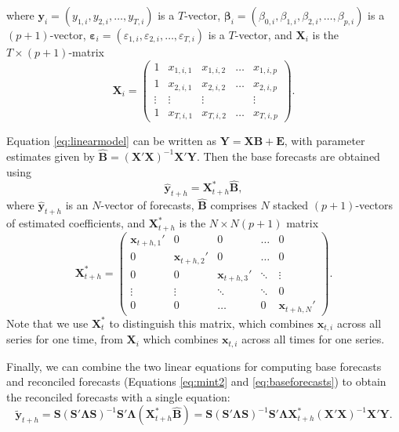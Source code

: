 \documentclass[11pt,a4paper,]{article}
\begin{document}
where \(\bm{y}_i = (y_{1,i}, y_{2,i}, \dots, y_{T,i})\) is a \(T\)-vector, \({\bm{\beta}}_i = (\beta_{0,i}, \beta_{1,i}, \beta_{2,i}, \dots, \beta_{p,i})\) is a \((p+1)\)-vector, \({\bm{\varepsilon}}_i = (\varepsilon_{1,i}, \varepsilon_{2,i}, \dots, \varepsilon_{T,i})\) is a \(T\)-vector, and \(\bm{X}_i\) is the \(T\times (p+1)\)-matrix
\begin{equation}\label{eq:Xmatrixdefinition}
  \bm{X}_i = \begin{pmatrix}
  1 & x_{1,i,1} & x_{1,i,2} & \dots & x_{1,i,p}\\
  1 & x_{2,i,1} & x_{2,i,2} & \dots & x_{2,i,p}\\
  \vdots & \vdots & \vdots & & \vdots \\
  1 & x_{T,i,1} & x_{T,i,2} & \dots & x_{T,i,p}
\end{pmatrix}.
\end{equation}

Equation \eqref{eq:linearmodel} can be written as \(\bm{Y} = \bm{X} \bm{B} + \bm{E}\), with parameter estimates given by \(\hat{\bm{B}} = (\bm{X}'\bm{X})^{-1} \bm{X}'\bm{Y}\). Then the base forecasts are obtained using
\begin{equation}\label{eq:baseforecasts}
  \hat{\bm{y}}_{t+h} = \bm{X}_{t+h}^* \hat{\bm{B}},
\end{equation}
where \(\hat{\bm{y}}_{t+h}\) is an \(N\)-vector of forecasts, \(\hat{\bm{B}}\) comprises \(N\) stacked \((p+1)\)-vectors of estimated coefficients, and \(\bm{X}_{t+h}^*\) is the \(N\times N(p+1)\) matrix
\pagebreak[3]\begin{equation}
  \bm{X}_{t+h}^* =
  \begin{pmatrix}
  \bm{x}_{t+h,1}' & 0               & 0               & \dots  & 0\\
  0               & \bm{x}_{t+h,2}' & 0               & \dots  & 0\\
  0               & 0               & \bm{x}_{t+h,3}' & \ddots & \vdots \\
  \vdots          & \vdots          & \ddots          & \ddots & 0\\
  0               & 0               & \dots           & 0      & \bm{x}_{t+h,N}'
  \end{pmatrix}.
\end{equation}
Note that we use \(\bm{X}^*_{t}\) to distinguish this matrix, which combines \(\bm{x}_{t,i}\) across all series for one time, from \(\bm{X}_i\) which combines \(\bm{x}_{t,i}\) across all times for one series.

Finally, we can combine the two linear equations for computing base forecasts and reconciled forecasts (Equations \eqref{eq:mint2} and \eqref{eq:baseforecasts}) to obtain the reconciled forecasts with a single equation:
\begin{equation}\label{eq:singlestep}
    \tilde{\bm{y}}_{t+h} = \bm{S}(\bm{S}'\bm{\Lambda}\bm{S})^{-1}\bm{S}'\bm{\Lambda}
                            (\bm{X}_{t+h}^* \hat{\bm{B}})
                         = \bm{S}(\bm{S}'\bm{\Lambda}\bm{S})^{-1}\bm{S}'\bm{\Lambda}
                            \bm{X}_{t+h}^* (\bm{X}'\bm{X})^{-1} \bm{X}'\bm{Y}.
\end{equation}
\end{document}
